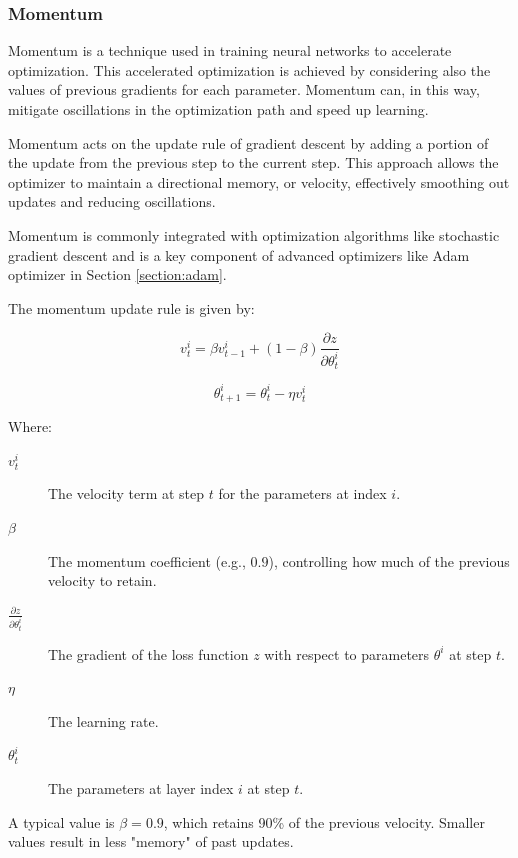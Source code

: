 		\bigskip
		\subsubsection{Momentum}
		\label{section:momentum}
		
		Momentum is a technique used in training neural networks to accelerate optimization. This accelerated optimization is achieved by considering also the values of previous gradients for each parameter. Momentum can, in this way, mitigate oscillations in the optimization path and speed up learning\cite{zhang2011momentum}.
		
		Momentum acts on the update rule of gradient descent by adding a portion of the update from the previous step to the current step. This approach allows the optimizer to maintain a directional memory, or velocity, effectively smoothing out updates and reducing oscillations.
		
		Momentum is commonly integrated with optimization algorithms like stochastic gradient descent and is a key component of advanced optimizers like Adam optimizer in Section \ref{section:adam}.
		
		The momentum update rule is given by:
		
		\begin{equation}
			v^i_t = \beta v^i_{t-1} + (1 - \beta)\frac{\partial z}{\partial \theta^i_{t}}	
		\end{equation}
		
		\begin{equation}
			\theta^i_{t+1} = \theta^i_t - \eta v^i_t
		\end{equation}
		
		Where:
		\begin{description}
			\item[$v^i_t$] The velocity term at step $t$ for the parameters at index $i$.
			\item[$\beta$] The momentum coefficient (e.g., $0.9$), controlling how much of the previous velocity to retain.
			\item[$\frac{\partial z}{\partial \theta^i_{t}}$] The gradient of the loss function $z$ with respect to parameters $\theta^i$ at step $t$.
			\item[$\eta$] The learning rate.
			\item[$\theta^i_t$] The parameters at layer index $i$ at step $t$.
		\end{description}
		\bigskip

		
		
		A typical value is $\beta = 0.9$, which retains 90\% of the previous velocity. Smaller values result in less "memory" of past updates.  


